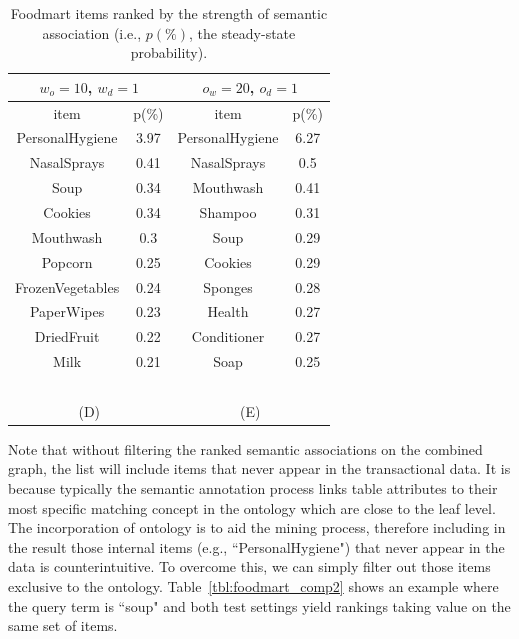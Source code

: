\begin{table}[tbh]
\begin{center}
\begin{tabular}{ c c || c c }
\hline
\multicolumn{2}{c||}{$w_o=10$, $w_d=1$}&\multicolumn{2}{c}{$o_w=20$, $o_d=1$}\\
\hline
item	&	p(\%)	&	item	&	p(\%)	\\
\hline																			
PersonalHygiene	&	3.97	&	 PersonalHygiene	&	6.27	\\
NasalSprays	&	0.41	&	NasalSprays	&	0.5	\\
Soup	&	0.34	&	Mouthwash	&	0.41	\\
Cookies	&	0.34	&	Shampoo	&	0.31	\\
Mouthwash	&	0.3	&	Soup	&	0.29	\\
Popcorn	&	0.25	&	Cookies	&	0.29	 \\
FrozenVegetables	&	0.24	&	Sponges	&	0.28	 \\
PaperWipes	&	0.23	&	Health	&	0.27	 \\
DriedFruit	&	0.22	&	Conditioner	&	0.27	\\
Milk	&	0.21	&	Soap	&	0.25	\\
\hline
\multicolumn{4}{c}{~}\\
\multicolumn{2}{c}{(D)}  &  \multicolumn{2}{c}{(E)}  \\
\end{tabular}
\end{center}
\caption{\label{tbl:foodmart_comp} Foodmart items ranked by the strength of semantic association (i.e., $p(\%)$, the steady-state probability).}
\end{table}

Note that without filtering the ranked semantic associations on the combined graph, the list will include items that never appear in the transactional data. It is because typically the semantic annotation process links table attributes to their most specific matching concept in the ontology which are close to the leaf level. The incorporation of ontology is to aid the mining process, therefore including in the result those internal items (e.g., ``PersonalHygiene") that never appear in the data is counterintuitive. To overcome this, we can simply filter out those items exclusive to the ontology. Table~\ref{tbl:foodmart_comp2} shows an example where the query term is ``soup" and both test settings yield rankings taking value on the same set of items.


